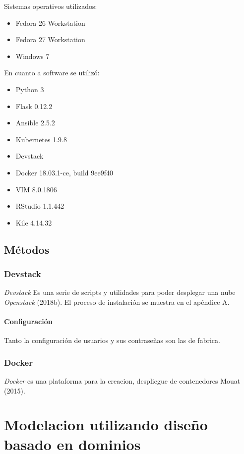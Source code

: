 \documentclass[12pt,twoside]{reedthesis}
\providecommand{\tightlist}{%
  \setlength{\itemsep}{0pt}\setlength{\parskip}{0pt}}
\begin{document}
Sistemas operativos utilizados:
\begin{itemize}
\tightlist
\item
  Fedora 26 Workstation
\item
  Fedora 27 Workstation
\item
  Windows 7
\end{itemize}
En cuanto a software se utilizó:
\begin{itemize}
\tightlist
\item
  Python 3
\item
  Flask 0.12.2
\item
  Ansible 2.5.2
\item
  Kubernetes 1.9.8
\item
  Devstack
\item
  Docker 18.03.1-ce, build 9ee9f40
\item
  VIM 8.0.1806
\item
  RStudio 1.1.442
\item
  Kile 4.14.32
\end{itemize}
\hypertarget{metodos}{%
\section{Métodos}\label{metodos}}

\hypertarget{devstack}{%
\subsection{Devstack}\label{devstack}}

\emph{Devstack} Es una serie de scripts y utilidades para poder desplegar una nube \emph{Openstack} (2018b). El proceso de instalación se muestra en el apéndice A.

\hypertarget{configuracion}{%
\subsubsection{Configuración}\label{configuracion}}

Tanto la configuración de usuarios y sus contraseñas son las de fabrica.

\hypertarget{docker}{%
\subsection{Docker}\label{docker}}

\emph{Docker} es una plataforma para la creacion, despliegue de contenedores Mouat (2015).

\hypertarget{modelacion-utilizando-diseno-basado-en-dominios}{%
\chapter{Modelacion utilizando diseño basado en dominios}\label{modelacion-utilizando-diseno-basado-en-dominios}}
\end{document}
